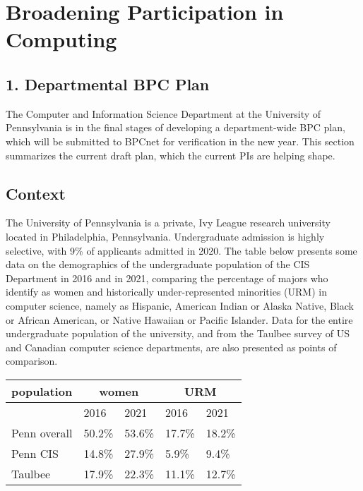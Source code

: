 
\section*{Broadening Participation in Computing}

\subsection*{1. Departmental BPC Plan}

The Computer and Information Science Department at the University of
Pennsylvania is in the final stages of developing a department-wide
BPC plan, which will be submitted to BPCnet for verification in the
new year.  This section summarizes the current draft plan, which the
current PIs are helping shape.

\subsection*{Context}

The University of Pennsylvania is a private, Ivy League research university located in Philadelphia, Pennsylvania. Undergraduate admission is highly selective, with 9\% of applicants admitted in 2020. The table below presents some data on the demographics of the undergraduate population of the CIS Department in 2016 and in 2021, comparing the percentage of majors who identify as women and historically under-represented minorities (URM) in computer science, namely as Hispanic, American Indian or Alaska Native, Black or African American, or Native Hawaiian or Pacific Islander. Data for the entire undergraduate population of the university, and from the Taulbee survey of US and Canadian computer science departments, are also presented as points of comparison.

\begin{center}
\begin{tabular}{|l|l|l|l|l|}
\hline
  population & \multicolumn{2}{|c|}{women} & \multicolumn{2}{|c|}{URM}
\\
\hline
  & 2016 & 2021 & 2016 & 2021
\\
\hline
Penn overall &
50.2\% &
53.6\% &
17.7\% &
18.2\%
\\
Penn CIS &
14.8\% &
27.9\% &
5.9\% &
9.4\%
\\
Taulbee &
17.9\% &
22.3\% &
11.1\% &
12.7\% \\
\hline
\end{tabular}
\end{center}

